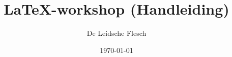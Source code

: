 \usepackage{color}

\usepackage{graphicx} %

\usepackage{enumerate}

\usepackage[official]{eurosym}

\usepackage{url}

\usepackage{float}

\usepackage{listings}
\lstset{language=C++}

\usepackage[hidelinks]{hyperref}




\newcommand{\beqn}{\begin{align*}} %
\newcommand{\eeqn}{\end{align*}} %

\newcommand{\N}{\mathbb{N}} %
\newcommand{\pyth}[4][2]{#2^{#1} + #3^{#1} = #4^{#1}} %





\title{\LaTeX-workshop (Handleiding)}
\author{De Leidsche Flesch}
\date{\today}	%

\setcounter{section}{-1}

